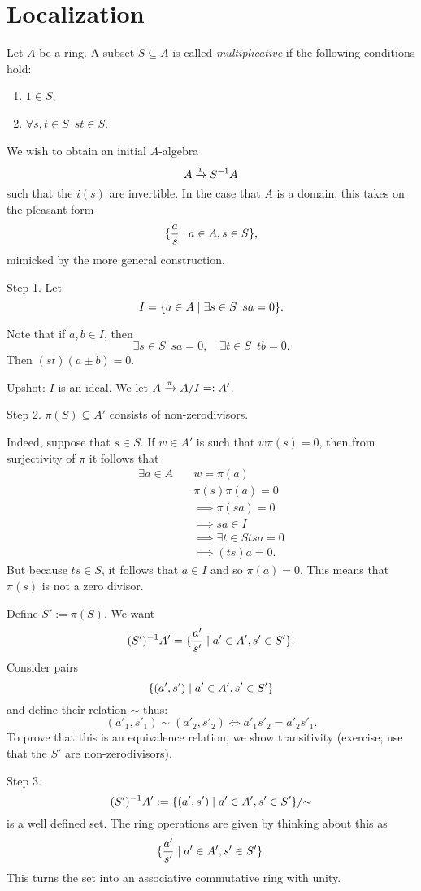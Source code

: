 \section{Localization}
\begin{df}
Let $A$ be a ring. A subset $S \subseteq A$ is called \textit{multiplicative} if the following conditions hold:
\begin{enumerate}
\item $1 \in S$,
\item $\forall s, t \in S \enspace st \in S$.
\end{enumerate}
\end{df}

We wish to obtain an initial $A$-algebra
\[A \xrightarrow{i} S^{-1}A\]
such that the $i(s)$ are invertible. In the case that \(A\) is a domain, this takes on the pleasant form
\[ \{\frac{a}{s} \mathrel{|} a \in A, s \in S \},\]
mimicked by the more general construction.

\begin{construction}
  \mbox{}
  Step 1.
Let
\[I = \{ a \in A \mathrel{|} \exists s \in S \enspace sa = 0 \}.\]

Note that if $a, b \in I$, then
\[ \exists s \in S \enspace sa = 0, \quad \exists t \in S \enspace tb = 0.\]
Then $(st)(a \pm b) = 0$.

Upshot: $I$ is an ideal.
We let
$A \xrightarrow{\pi} A/I =: A'$.

Step 2.
$\pi(S) \subseteq A'$
consists of non-zerodivisors.

Indeed, suppose that $s \in S$. If $w \in A'$ is such that $w \pi(s) = 0$, then from surjectivity of $\pi$ it follows that
\begin{align*}
  \exists a \in A \quad & w = \pi(a) \\
                        & \pi(s) \pi(a) = 0 \\
                        & \implies \pi(sa) = 0 \\
                        & \implies  sa \in I \\
                        & \implies \exists t \in S tsa = 0 \\
                        & \implies (ts)a = 0.
\end{align*}
But because $ts \in S$, it follows that $a \in I$ and so $\pi(a) = 0$. This means that $\pi(s)$ is not a zero divisor.

Define $S' := \pi(S)$. We want
\[ (S')^{-1} A' = \{ \frac{a'}{s'} \mathrel{|} a' \in A', s' \in S' \}.\]
Consider pairs
\[\{(a', s') \mathrel{|} a' \in A', s' \in S'\}\]
and define their relation $\sim$ thus:
\[(a'_1, s'_1) \sim (a'_2, s'_2) \iff a'_1 s'_2 = a'_2 s'_1.\]
To prove that this is an equivalence relation, we show transitivity (exercise; use that the $S'$ are non-zerodivisors).

Step 3.
\[(S')^{-1}A' := \{(a', s') \mathrel{|} a' \in A', s' \in S' \} / {\sim}\]
is a well defined set.
The ring operations are given by thinking about this as
\[ \{ \frac{a'}{s'} \mathrel{|} a' \in A', s' \in S'\}.\]
This turns the set into an associative commutative ring with unity.
\end{construction}

